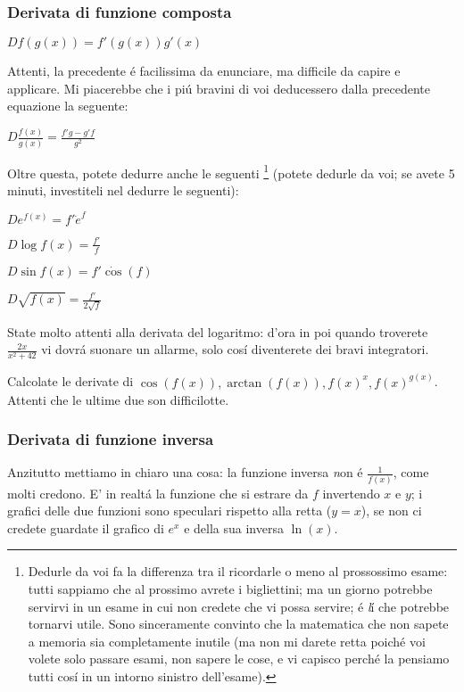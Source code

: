 \subsubsection{Derivata di funzione composta}
$D f(g(x)) = f'(g(x))g'(x)$

Attenti, la precedente \'e facilissima da enunciare, ma difficile da capire e applicare. Mi piacerebbe che i pi\'u bravini di voi deducessero dalla precedente equazione la seguente: 

$D \frac{f(x)}{g(x)} = \frac{f'g-g'f}{g^2}$

Oltre questa, potete dedurre anche le seguenti \footnote{Dedurle da voi fa la differenza tra il ricordarle o meno al prossossimo esame:
tutti sappiamo che al prossimo avrete i bigliettini; ma un giorno potrebbe servirvi in un esame in cui non credete che vi possa servire;
\'e {\emph l\'i} che potrebbe tornarvi utile. Sono sinceramente convinto che la matematica che non sapete a memoria sia completamente inutile
(ma non mi darete retta poich\'e voi volete solo passare esami, non sapere le cose, e vi capisco perch\'e la pensiamo tutti cos\'i in un
intorno sinistro dell'esame).} (potete dedurle da voi; se avete 5 minuti, investiteli nel dedurre le seguenti):

$D e^{f(x)} = f' \dot e^f$

$D \log{f(x)} = \frac{f'}{f} $

$D \sin{f(x)} = f' \dot \cos(f)$

$D \sqrt{f(x)} = \frac{f'}{2\sqrt{f}}$

State molto attenti alla derivata del logaritmo: d'ora in poi quando troverete $\frac{2x}{x^2+42}$ vi
dovr\'a suonare un allarme, solo cos\'i diventerete dei bravi integratori.

\begin{esercizio}
Calcolate le derivate di $\cos(f(x)),\arctan(f(x)),f(x)^x,f(x)^{g(x)}$. Attenti che le ultime due son difficilotte.
\end{esercizio}

\subsubsection{Derivata di funzione inversa}

Anzitutto mettiamo in chiaro una cosa: la funzione inversa {\emph non} \'e $\frac{1}{f(x)}$, come molti credono.
E' in realt\'a la funzione che si estrare da $f$ invertendo $x$ e $y$; i grafici delle due funzioni sono speculari rispetto alla retta ($y=x$), se non ci credete guardate il grafico di $e^x$ e della sua inversa $\ln(x)$.

